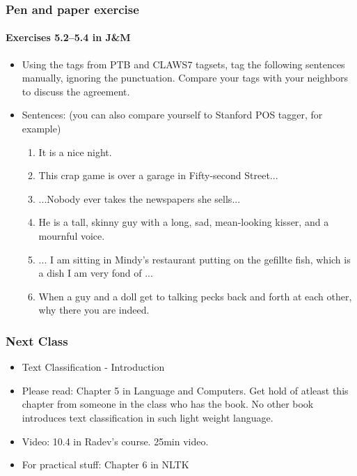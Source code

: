 \documentclass{beamer}
\begin{document}
\begin{frame}
\frametitle{Pen and paper exercise}
\framesubtitle{Exercises 5.2--5.4 in J\&M}
\begin{itemize}
\item Using the tags from PTB and CLAWS7 tagsets, tag the following sentences manually, ignoring the punctuation. Compare your tags with your neighbors to discuss the agreement.
\item Sentences: (you can also compare yourself to Stanford POS tagger, for example)
\begin{enumerate}
\item It is a nice night.
\item This crap game is over a garage in Fifty-second Street...
\item ...Nobody ever takes the newspapers she sells...
\item He is a tall, skinny guy with a long, sad, mean-looking kisser, and a mournful voice.
\item ... I am sitting in Mindy's restaurant putting on the gefillte fish, which is a dish I am very fond of ...
\item When a guy and a doll get to talking pecks back and forth at each other, why there you are indeed. 
\end{enumerate}
\end{itemize}
\end{frame}

\begin{frame}
\frametitle{Next Class}
\begin{itemize}
\item Text Classification - Introduction
\item Please read: Chapter 5 in Language and Computers. Get hold of atleast this chapter from someone in the class who has the book. No other book introduces text classification in such light weight language.
\item Video: 10.4 in Radev's course. 25min video. 
\item For practical stuff: Chapter 6 in NLTK
\end{itemize}
\end{frame}
\end{document}
